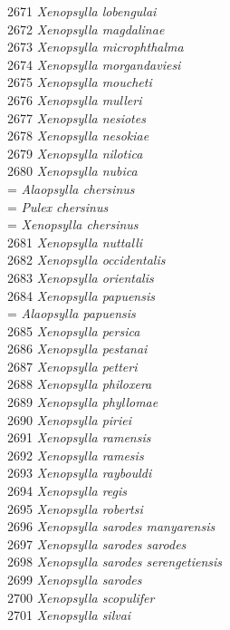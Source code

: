 \documentclass[
]{article}
\begin{document}
2671 \emph{Xenopsylla lobengulai}\\
2672 \emph{Xenopsylla magdalinae}\\
2673 \emph{Xenopsylla microphthalma}\\
2674 \emph{Xenopsylla morgandaviesi}\\
2675 \emph{Xenopsylla moucheti}\\
2676 \emph{Xenopsylla mulleri}\\
2677 \emph{Xenopsylla nesiotes}\\
2678 \emph{Xenopsylla nesokiae}\\
2679 \emph{Xenopsylla nilotica}\\
2680 \emph{Xenopsylla nubica}\\
= \emph{Alaopsylla chersinus}\\
= \emph{Pulex chersinus}\\
= \emph{Xenopsylla chersinus}\\
2681 \emph{Xenopsylla nuttalli}\\
2682 \emph{Xenopsylla occidentalis}\\
2683 \emph{Xenopsylla orientalis}\\
2684 \emph{Xenopsylla papuensis}\\
= \emph{Alaopsylla papuensis}\\
2685 \emph{Xenopsylla persica}\\
2686 \emph{Xenopsylla pestanai}\\
2687 \emph{Xenopsylla petteri}\\
2688 \emph{Xenopsylla philoxera}\\
2689 \emph{Xenopsylla phyllomae}\\
2690 \emph{Xenopsylla piriei}\\
2691 \emph{Xenopsylla ramensis}\\
2692 \emph{Xenopsylla ramesis}\\
2693 \emph{Xenopsylla raybouldi}\\
2694 \emph{Xenopsylla regis}\\
2695 \emph{Xenopsylla robertsi}\\
2696 \emph{Xenopsylla sarodes manyarensis}\\
2697 \emph{Xenopsylla sarodes sarodes}\\
2698 \emph{Xenopsylla sarodes serengetiensis}\\
2699 \emph{Xenopsylla sarodes}\\
2700 \emph{Xenopsylla scopulifer}\\
2701 \emph{Xenopsylla silvai}\\
\end{document}
